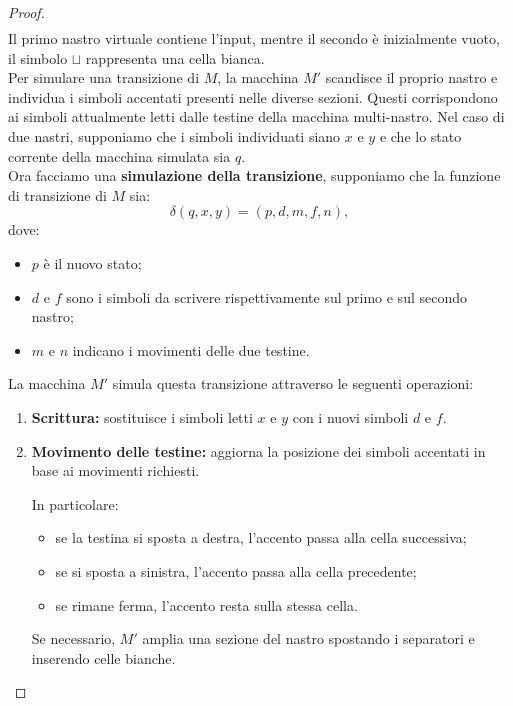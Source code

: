 \begin{proof}
\[\begin{array}{|c|c|c|c|c|c|c|c|}
\end{array}   
\]
Il primo nastro virtuale contiene l'input, mentre il secondo è inizialmente vuoto, il simbolo $\sqcup$ rappresenta una cella bianca.\\
Per simulare una transizione di $M$, la macchina $M'$ scandisce il proprio nastro e individua i simboli
accentati presenti nelle diverse sezioni. Questi corrispondono ai simboli attualmente letti
dalle testine della macchina multi-nastro. Nel caso di due nastri, supponiamo che i simboli
individuati siano $x$ e $y$ e che lo stato corrente
della macchina simulata sia $q$.\smallskip\\
Ora facciamo una \textbf{simulazione della transizione}, supponiamo che la funzione di transizione di $M$ sia:
\[
    \delta(q,x,y)=(p,d,m,f,n),
\]
dove:
\begin{itemize}
    \item $p$ è il nuovo stato;
    \item $d$ e $f$ sono i simboli da scrivere
          rispettivamente sul primo e sul secondo nastro;
    \item $m$ e $n$ indicano i movimenti
          delle due testine.
\end{itemize}
La macchina $M'$ simula questa transizione attraverso le seguenti operazioni:
\begin{enumerate}
    \item \textbf{Scrittura:}
    sostituisce i simboli letti $x$ e $y$
    con i nuovi simboli $d$ e $f$.

    \item \textbf{Movimento delle testine:}
    aggiorna la posizione dei simboli accentati
    in base ai movimenti richiesti.

    In particolare:
    \begin{itemize}[label =--]
        \item se la testina si sposta a destra,
              l'accento passa alla cella successiva;
        \item se si sposta a sinistra,
              l'accento passa alla cella precedente;
        \item se rimane ferma,
              l'accento resta sulla stessa cella.
    \end{itemize}

    Se necessario, $M'$ amplia una sezione del nastro
    spostando i separatori e inserendo celle bianche.


\end{enumerate}
\end{proof}
